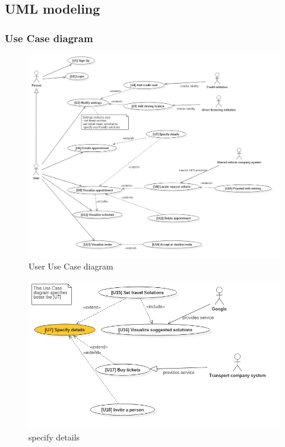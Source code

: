 \subsection{UML modeling}
	\subsubsection{Use Case diagram}
		\smallskip
		\begin{figure}[H]	
			\centerline{\includegraphics[width=\paperwidth-1]{Images/UseCaseDiagram1}}
			\caption{User Use Case diagram}
		\end{figure}

	\begin{figure}[H]	
	\centerline{\includegraphics[width=\paperwidth-1]{Images/UseCaseDiagram2}}
	\caption{ specify details }
\end{figure}

